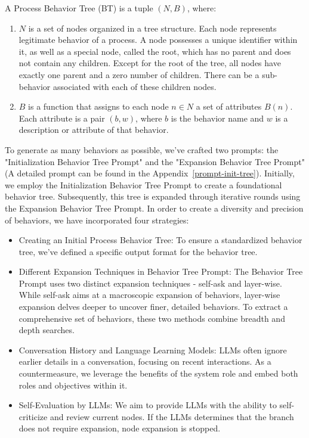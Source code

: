 \begin{definition}
A Process Behavior Tree (BT) is a tuple \((N, B)\), where:
\begin{enumerate}
    \item \(N\) is a set of nodes organized in a tree structure. Each node represents legitimate behavior of a process. A node possesses a unique identifier within it, as well as a special node, called the root, which has no parent and does not contain any children. Except for the root of the tree, all nodes have exactly one parent and a zero number of children. There can be a sub-behavior associated with each of these children nodes.
    \item \(B\) is a function that assigns to each node \(n \in N\) a set of attributes \(B(n)\). Each attribute is a pair \((b, w)\), where \(b\) is the behavior name and \(w\) is a description or attribute of that behavior. 
\end{enumerate}
\end{definition}

To generate as many behaviors as possible, we've crafted two prompts: the "Initialization Behavior Tree Prompt" and the "Expansion Behavior Tree Prompt" (A detailed prompt can be found in the Appendix~\ref{prompt-init-tree}). Initially, we employ the Initialization Behavior Tree Prompt to create a foundational behavior tree. Subsequently, this tree is expanded through iterative rounds using the Expansion Behavior Tree Prompt. In order to create a diversity and precision of behaviors, we have incorporated four strategies:
\begin{itemize}
    \item Creating an Initial Process Behavior Tree: To ensure a standardized behavior tree, we've defined a specific output format for the behavior tree.
    \item Different Expansion Techniques in Behavior Tree Prompt: The Behavior Tree Prompt uses two distinct expansion techniques - self-ask and layer-wise. While self-ask aims at a macroscopic expansion of behaviors, layer-wise expansion delves deeper to uncover finer, detailed behaviors. To extract a comprehensive set of behaviors, these two methods combine breadth and depth searches.
    \item Conversation History and Language Learning Models: LLMs often ignore earlier details in a conversation, focusing on recent interactions. As a countermeasure, we leverage the benefits of the system role and embed both roles and objectives within it.
    \item Self-Evaluation by LLMs: We aim to provide LLMs with the ability to self-criticize and review current nodes. If the LLMs determines that the branch does not require expansion, node expansion is stopped.
\end{itemize}

